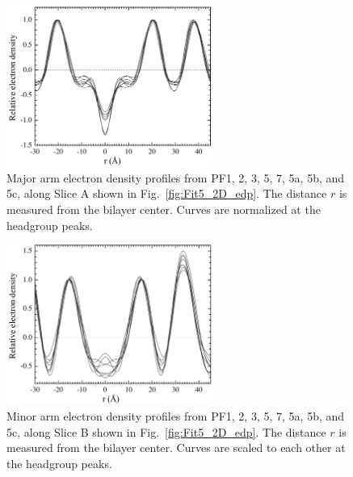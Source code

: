 \begin{figure}[htbp]
  \centering
  \includegraphics[width=0.6\textwidth]{figures/ripple/LAXS/major_arm_overlay}
  \caption[Major arm electron density profiles from PF1, 2, 3, 5, 7, 
  5a, 5b, and 5c, along Slice A shown in 
  Fig.~\ref{fig:Fit5_2D_edp}]
  {Major arm electron density profiles from PF1, 2, 3, 5, 7, 
  5a, 5b, and 5c, along Slice A shown in 
  Fig.~\ref{fig:Fit5_2D_edp}. 
  The distance $r$ is measured from the bilayer center.
  Curves are normalized at the headgroup peaks.}
  \label{fig:major_arm_overlay}
\end{figure}

\begin{figure}[htbp]
  \centering
  \includegraphics[width=0.6\textwidth]{figures/ripple/LAXS/minor_arm_overlay}
  \caption[Minor arm electron density profiles from PF1, 2, 3, 5, 7, 
  5a, 5b, and 5c, along Slice B shown in 
  Fig.~\ref{fig:Fit5_2D_edp}]
  {Minor arm electron density profiles from PF1, 2, 3, 5, 7, 
  5a, 5b, and 5c, along Slice B shown in 
  Fig.~\ref{fig:Fit5_2D_edp}. 
  The distance $r$ is measured from the bilayer center.
  Curves are scaled to each other at the headgroup peaks.}
  \label{fig:minor_arm_overlay}
\end{figure}

\newpage
